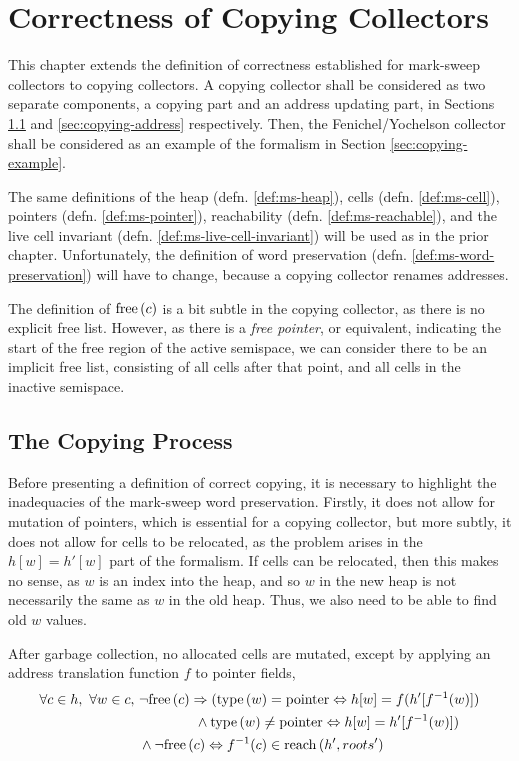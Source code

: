 \chapter{Correctness of Copying Collectors}
\label{sec:copying}

This chapter extends the definition of correctness established for
mark-sweep collectors to copying collectors. A copying collector shall
be considered as two separate components, a copying part and an
address updating part, in Sections \ref{sec:copying-copying} and
\ref{sec:copying-address} respectively. Then, the Fenichel/Yochelson
collector shall be considered as an example of the formalism in
Section \ref{sec:copying-example}.

The same definitions of the heap (defn. \ref{def:ms-heap}), cells
(defn. \ref{def:ms-cell}), pointers (defn. \ref{def:ms-pointer}),
reachability (defn. \ref{def:ms-reachable}), and the live cell
invariant (defn. \ref{def:ms-live-cell-invariant}) will be used as in
the prior chapter. Unfortunately, the definition of word preservation
(defn. \ref{def:ms-word-preservation}) will have to change, because a
copying collector renames addresses.

The definition of $\mathrm{free}\left(c\right)$ is a bit subtle in the copying collector,
as there is no explicit free list. However, as there is a \textit{free
  pointer}, or equivalent, indicating the start of the free region of
the active semispace, we can consider there to be an implicit free
list, consisting of all cells after that point, and all cells in the
inactive semispace.

\section{The Copying Process}
\label{sec:copying-copying}

Before presenting a definition of correct copying, it is necessary to
highlight the inadequacies of the mark-sweep word
preservation. Firstly, it does not allow for mutation of pointers,
which is essential for a copying collector, but more subtly, it does
not allow for cells to be relocated, as the problem arises in the
$h[w] = h'[w]$ part of the formalism. If cells can be relocated, then
this makes no sense, as $w$ is an index into the heap, and so $w$ in
the new heap is not necessarily the same as $w$ in the old heap. Thus,
we also need to be able to find old $w$ values.

\begin{definition}
  \label{def:c-correct-copying}
  After garbage collection, no allocated cells are mutated, except by
  applying an address translation function $f$ to pointer fields,
  \begin{align*}
    \forall c \in h,\ \forall w \in c,\ &\lnot\mathrm{free}\left(c\right) \Rightarrow
    (\mathrm{type}\left(w\right) = \mathrm{pointer} \Leftrightarrow h[w] = f(h'[f^{-1}(w)])\\
    &\quad\quad\quad\quad \land \mathrm{type}\left(w\right) \neq \mathrm{pointer}
    \Leftrightarrow h[w] = h'[f^{-1}(w)])\\
    &\land \lnot\mathrm{free}\left(c\right) \Leftrightarrow f^{-1}(c) \in \mathrm{reach}\left(h', roots'\right)
  \end{align*}
\end{definition}

